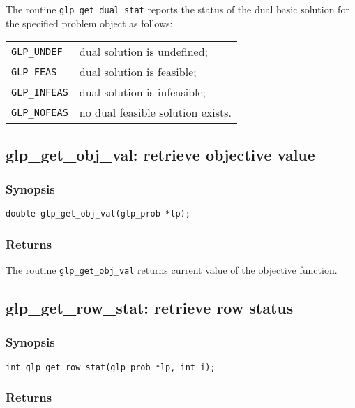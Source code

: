 The routine \verb|glp_get_dual_stat| reports the status of the dual
basic solution for the specified problem object as follows:

\begin{tabular}{@{}ll}
\verb|GLP_UNDEF|  & dual solution is undefined; \\
\verb|GLP_FEAS|   & dual solution is feasible; \\
\verb|GLP_INFEAS| & dual solution is infeasible; \\
\verb|GLP_NOFEAS| & no dual feasible solution exists. \\
\end{tabular}

\subsection{glp\_get\_obj\_val: retrieve objective value}

\subsubsection*{Synopsis}

\begin{verbatim}
double glp_get_obj_val(glp_prob *lp);
\end{verbatim}

\subsubsection*{Returns}

The routine \verb|glp_get_obj_val| returns current value of the
objective function.

\subsection{glp\_get\_row\_stat: retrieve row status}

\subsubsection*{Synopsis}

\begin{verbatim}
int glp_get_row_stat(glp_prob *lp, int i);
\end{verbatim}

\subsubsection*{Returns}

